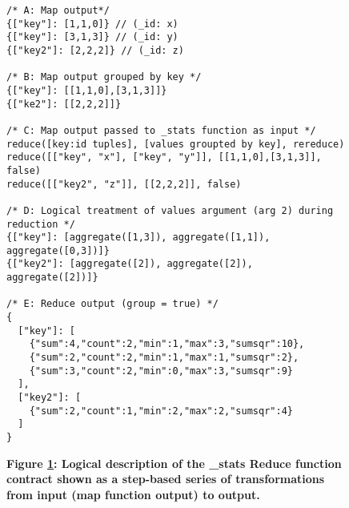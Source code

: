 \begin{figure}[H]
  \centering
  \begin{mdframed}[rightline=true,leftline=true]
    \begin{verbatim}
/* A: Map output*/
{["key"]: [1,1,0]} // (_id: x)
{["key"]: [3,1,3]} // (_id: y)
{["key2"]: [2,2,2]} // (_id: z)

/* B: Map output grouped by key */
{["key"]: [[1,1,0],[3,1,3]]}
{["ke2"]: [[2,2,2]]}

/* C: Map output passed to _stats function as input */
reduce([key:id tuples], [values groupted by key], rereduce)
reduce([["key", "x"], ["key", "y"]], [[1,1,0],[3,1,3]], false)
reduce([["key2", "z"]], [[2,2,2]], false)

/* D: Logical treatment of values argument (arg 2) during reduction */
{["key"]: [aggregate([1,3]), aggregate([1,1]),  aggregate([0,3])]}
{["key2"]: [aggregate([2]), aggregate([2]),  aggregate([2])]}

/* E: Reduce output (group = true) */
{
  ["key"]: [
    {"sum":4,"count":2,"min":1,"max":3,"sumsqr":10},
    {"sum":2,"count":2,"min":1,"max":1,"sumsqr":2},
    {"sum":3,"count":2,"min":0,"max":3,"sumsqr":9}
  ],
  ["key2"]: [
    {"sum":2,"count":1,"min":2,"max":2,"sumsqr":4}
  ]
}
    \end{verbatim}
  \end{mdframed}
  \caption[\_stats Reduce Function Logic]{\textbf{Figure \ref{fig-stats-reduce-fn}: Logical description of the \_stats Reduce function contract shown as a step-based series of transformations from input (map function output) to output.}}
  \label{fig-stats-reduce-fn}
\end{figure}